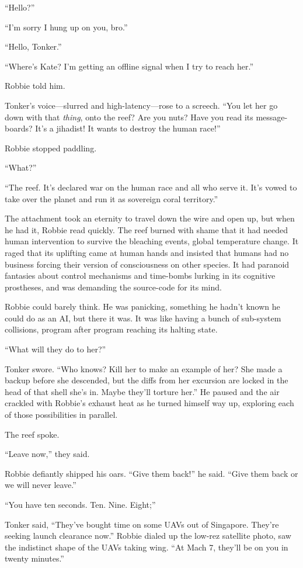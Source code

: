 “Hello?”

“I’m sorry I hung up on you, bro.”

“Hello, Tonker.”

“Where’s Kate? I’m getting an offline signal when I try to reach
her.”

Robbie told him.

Tonker’s voice—slurred and high-latency—rose to a screech. “You let
her go down with that \emph{thing}, onto the reef? Are you nuts?
Have you read its message-boards? It’s a jihadist! It wants to
destroy the human race!”

Robbie stopped paddling.

“What?”

“The reef. It’s declared war on the human race and all who serve
it. It’s vowed to take over the planet and run it as sovereign
coral territory.”

The attachment took an eternity to travel down the wire and open
up, but when he had it, Robbie read quickly. The reef burned with
shame that it had needed human intervention to survive the
bleaching events, global temperature change. It raged that its
uplifting came at human hands and insisted that humans had no
business forcing their version of consciousness on other species.
It had paranoid fantasies about control mechanisms and time-bombs
lurking in its cognitive prostheses, and was demanding the
source-code for its mind.

Robbie could barely think. He was panicking, something he hadn’t
known he could do as an AI, but there it was. It was like having a
bunch of sub-system collisions, program after program reaching its
halting state.

“What will they do to her?”

Tonker swore. “Who knows? Kill her to make an example of her? She
made a backup before she descended, but the diffs from her
excursion are locked in the head of that shell she’s in. Maybe
they’ll torture her.” He paused and the air crackled with Robbie’s
exhaust heat as he turned himself way up, exploring each of those
possibilities in parallel.

The reef spoke.

“Leave now,” they said.

Robbie defiantly shipped his oars. “Give them back!” he said. “Give
them back or we will never leave.”

“You have ten seconds. Ten. Nine. Eight;”

Tonker said, “They’ve bought time on some UAVs out of Singapore.
They’re seeking launch clearance now.” Robbie dialed up the low-rez
satellite photo, saw the indistinct shape of the UAVs taking wing.
“At Mach 7, they’ll be on you in twenty minutes.”

